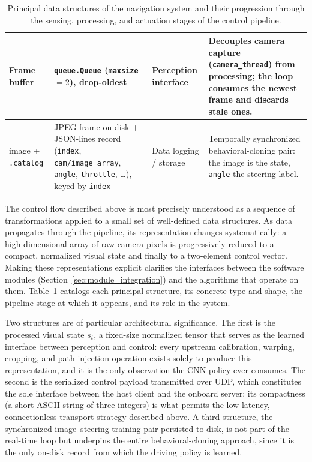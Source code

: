 \begin{table}[H]
\begin{tabularx}{\textwidth}{|>{\raggedright\arraybackslash}p{2.4cm}|>{\raggedright\arraybackslash}p{3.2cm}|>{\raggedright\arraybackslash}p{2.1cm}|>{\raggedright\arraybackslash}X|}
\hline
Frame buffer & \texttt{queue.Queue} (\texttt{maxsize}$=2$), drop-oldest & Perception interface & Decouples camera capture (\texttt{camera\_thread}) from processing; the loop consumes the newest frame and discards stale ones. \\
\hline
image + \texttt{.catalog} & JPEG frame on disk + JSON-lines record (\texttt{index}, \texttt{cam/image\_array}, \texttt{angle}, \texttt{throttle}, \dots), keyed by \texttt{index} & Data logging / storage & Temporally synchronized behavioral-cloning pair: the image is the state, \texttt{angle} the steering label. \\
\hline
\end{tabularx}
\caption{Principal data structures of the navigation system and their progression through the sensing, processing, and actuation stages of the control pipeline.}
\label{tab:data_structures}
\end{table}

The control flow described above is most precisely understood as a sequence of
transformations applied to a small set of well-defined data structures. As data
propagates through the pipeline, its representation changes systematically: a
high-dimensional array of raw camera pixels is progressively reduced to a compact,
normalized visual state and finally to a two-element control vector. Making these
representations explicit clarifies the interfaces between the software modules
(Section~\ref{sec:module_integration}) and the algorithms that operate on them.
Table~\ref{tab:data_structures} catalogs each principal structure, its concrete type
and shape, the pipeline stage at which it appears, and its role in the system.

Two structures are of particular architectural significance. The first is the
processed visual state $s_t$, a fixed-size normalized tensor that serves as the
learned interface between perception and control: every upstream calibration,
warping, cropping, and path-injection operation exists solely to produce this
representation, and it is the only observation the CNN policy ever consumes. The
second is the serialized control payload transmitted over UDP, which constitutes the
sole interface between the host client and the onboard server; its compactness
(a short ASCII string of three integers) is what permits the low-latency, connectionless
transport strategy described above. A third structure, the synchronized
image--steering training pair persisted to disk, is not part of the real-time loop but
underpins the entire behavioral-cloning approach, since it is the only on-disk
record from which the driving policy is learned.


